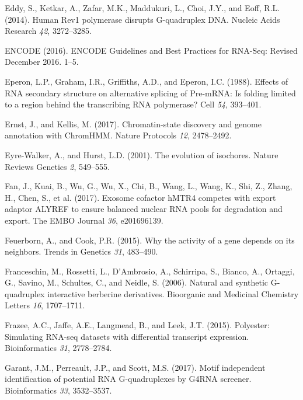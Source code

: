 \documentclass[12pt,a4paper,]{report}
\begin{document}
\leavevmode\hypertarget{ref-Eddy2014}{}%
Eddy, S., Ketkar, A., Zafar, M.K., Maddukuri, L., Choi, J.Y., and Eoff,
R.L. (2014). Human Rev1 polymerase disrupts G-quadruplex DNA. Nucleic
Acids Research \emph{42}, 3272--3285.

\leavevmode\hypertarget{ref-Encode2016}{}%
ENCODE (2016). ENCODE Guidelines and Best Practices for RNA-Seq: Revised
December 2016. 1--5.

\leavevmode\hypertarget{ref-Eperon1988}{}%
Eperon, L.P., Graham, I.R., Griffiths, A.D., and Eperon, I.C. (1988).
Effects of RNA secondary structure on alternative splicing of Pre-mRNA:
Is folding limited to a region behind the transcribing RNA polymerase?
Cell \emph{54}, 393--401.

\leavevmode\hypertarget{ref-Ernst2017}{}%
Ernst, J., and Kellis, M. (2017). Chromatin-state discovery and genome
annotation with ChromHMM. Nature Protocols \emph{12}, 2478--2492.

\leavevmode\hypertarget{ref-Eyre-Walker2001}{}%
Eyre-Walker, A., and Hurst, L.D. (2001). The evolution of isochores.
Nature Reviews Genetics \emph{2}, 549--555.

\leavevmode\hypertarget{ref-Fan2017}{}%
Fan, J., Kuai, B., Wu, G., Wu, X., Chi, B., Wang, L., Wang, K., Shi, Z.,
Zhang, H., Chen, S., et al. (2017). Exosome cofactor hMTR4 competes with
export adaptor ALYREF to ensure balanced nuclear RNA pools for
degradation and export. The EMBO Journal \emph{36}, e201696139.

\leavevmode\hypertarget{ref-Feuerborn2015}{}%
Feuerborn, A., and Cook, P.R. (2015). Why the activity of a gene depends
on its neighbors. Trends in Genetics \emph{31}, 483--490.

\leavevmode\hypertarget{ref-Franceschin2006}{}%
Franceschin, M., Rossetti, L., D'Ambrosio, A., Schirripa, S., Bianco,
A., Ortaggi, G., Savino, M., Schultes, C., and Neidle, S. (2006).
Natural and synthetic G-quadruplex interactive berberine derivatives.
Bioorganic and Medicinal Chemistry Letters \emph{16}, 1707--1711.

\leavevmode\hypertarget{ref-Frazee2015}{}%
Frazee, A.C., Jaffe, A.E., Langmead, B., and Leek, J.T. (2015).
Polyester: Simulating RNA-seq datasets with differential transcript
expression. Bioinformatics \emph{31}, 2778--2784.

\leavevmode\hypertarget{ref-Garant2017}{}%
Garant, J.M., Perreault, J.P., and Scott, M.S. (2017). Motif independent
identification of potential RNA G-quadruplexes by G4RNA screener.
Bioinformatics \emph{33}, 3532--3537.
\end{document}
